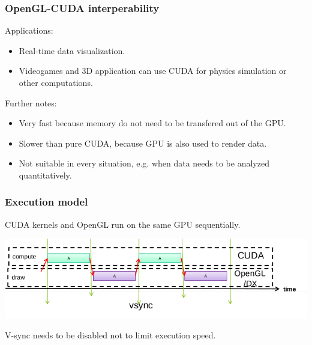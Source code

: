 \begin{frame}[fragile]

\frametitle{OpenGL-CUDA interperability}

Applications:
\begin{itemize}
    \item{Real-time data visualization.}
    \item{Videogames and 3D application can use CUDA for physics simulation or other computations.}
\end{itemize}

\vspace{5mm}

Further notes:
\begin{itemize}
    \item{Very fast because memory do not need to be transfered out of the GPU.}
    \item{Slower than pure CUDA, because GPU is also used to render data.}
    \item{Not suitable in every situation, e.g. when data needs to be analyzed quantitatively.}
\end{itemize}

\end{frame}

\begin{frame}[fragile]

\frametitle{Execution model}

CUDA kernels and OpenGL run on the same GPU sequentially.

\begin{center}
\includegraphics[width=\textwidth]{images/cuda_gl.png}
\end{center}

V-sync needs to be disabled not to limit execution speed.

\end{frame}

